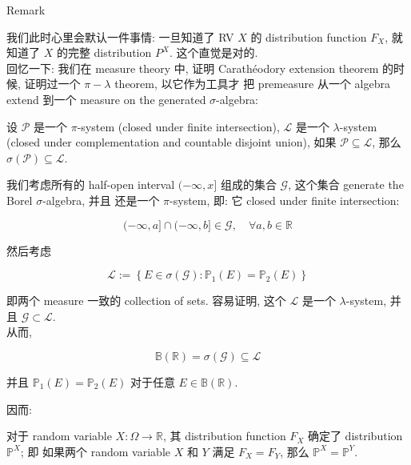 \begin{qlremark}{Remark}

我们此时心里会默认一件事情: 一旦知道了 RV \(\mathit{X}\) 的 distribution function \(\mathit{F}_{\mathit{X}}\), 就知道了 \(\mathit{X}\) 的完整 distribution \(\mathit{P}^{\mathit{X}}\). 这个直觉是对的.\\
回忆一下: 我们在 measure theory 中, 证明 Carathéodory extension theorem 的时候, 证明过一个 \(\mathit{\pi} - \mathit{\lambda}\) theorem, 以它作为工具才 把 premeasure 从一个 algebra extend 到一个 measure on the generated \(\mathit{\sigma}\)-algebra:

\begin{theorem}{}

设 \(\mathcal{P}\) 是一个 \(\mathit{\pi}\)-system (closed under finite intersection), \(\mathcal{L}\) 是一个 \(\mathit{\lambda}\)-system (closed under complementation and countable disjoint union), 如果 \(\mathcal{P} \subseteq \mathcal{L}\), 那么 \(\mathit{\sigma}(\mathcal{P}) \subseteq \mathcal{L}\).

\end{theorem}

我们考虑所有的 half-open interval \(( - \infty,\mathit{x}\rbrack\) 组成的集合 \(\mathcal{G}\), 这个集合 generate the Borel \(\mathit{\sigma}\)-algebra, 并且 还是一个 \(\mathit{\pi}\)-system, 即: 它 closed under finite intersection:

\[( - \infty,\mathit{a}\rbrack \cap ( - \infty,\mathit{b}\rbrack \in \mathcal{G},\quad\forall\mathit{a},\mathit{b} \in \mathbb{R}\]

然后考虑

\[\mathcal{L} := \left\{ {\mathit{E} \in \mathit{\sigma}(\mathcal{G}):\mathbb{P}_{1}(\mathit{E}) = \mathbb{P}_{2}(\mathit{E})} \right\}\]

即两个 measure 一致的 collection of sets. 容易证明, 这个 \(\mathcal{L}\) 是一个 \(\mathit{\lambda}\)-system, 并且 \(\mathcal{G} \subset \mathcal{L}\).\\
从而,

\[\mathbb{B}(\mathbb{R}) = \mathit{\sigma}(\mathcal{G}) \subseteq \mathcal{L}\]

并且 \(\mathbb{P}_{1}(\mathit{E}) = \mathbb{P}_{2}(\mathit{E})\) 对于任意 \(\mathit{E} \in \mathbb{B}(\mathbb{R})\).

因而:

\begin{corollary}{}

对于 random variable \(\mathit{X}:\Omega\rightarrow\mathbb{R}\), 其 distribution function \(\mathit{F}_{\mathit{X}}\) 确定了 distribution \(\mathbb{P}^{\mathit{X}}\); 即 如果两个 random variable \(\mathit{X}\) 和 \(\mathit{Y}\) 满足 \(\mathit{F}_{\mathit{X}} = \mathit{F}_{\mathit{Y}}\), 那么 \(\mathbb{P}^{\mathit{X}} = \mathbb{P}^{\mathit{Y}}\).

\end{corollary}

\end{qlremark}


